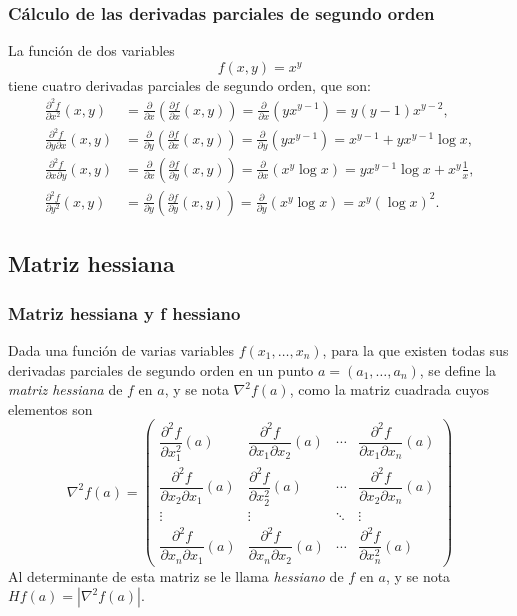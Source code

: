 \begin{frame}
\frametitle{Cálculo de las derivadas parciales de segundo orden}
La función de dos variables
\[f(x,y)=x^y\]
tiene cuatro derivadas parciales de segundo orden, que son:
\begin{align*}
\frac{\partial^2 f}{\partial x^2}(x,y) &=
\frac{\partial}{\partial x}\left(\frac{\partial f}{\partial x}(x,y)\right) =
\frac{\partial}{\partial x}\left(yx^{y-1}\right) =
y(y-1)x^{y-2},\\
\frac{\partial^2 f}{\partial y \partial x}(x,y) &=
\frac{\partial}{\partial y}\left(\frac{\partial f}{\partial x}(x,y)\right) =
\frac{\partial}{\partial y}\left(yx^{y-1}\right) =
x^{y-1}+yx^{y-1}\log x,\\
\frac{\partial^2 f}{\partial x \partial y}(x,y) &=
\frac{\partial}{\partial x}\left(\frac{\partial f}{\partial y}(x,y)\right) =
\frac{\partial}{\partial x}\left(x^y\log x \right) =
yx^{y-1}\log x+x^y\frac{1}{x},\\
\frac{\partial^2 f}{\partial y^2}(x,y) &=
\frac{\partial}{\partial y}\left(\frac{\partial f}{\partial y}(x,y)\right) =
\frac{\partial}{\partial y}\left(x^y\log x \right) =
x^y(\log x)^2.
\end{align*}
\end{frame}


\subsection{Matriz hessiana}
\begin{frame}
\frametitle{Matriz hessiana y f hessiano}
\begin{definicion}
Dada una función de varias variables $f(x_1,\ldots,x_n)$, para la que existen todas sus derivadas parciales de segundo
orden en un punto $a=(a_1,\ldots,a_n)$, se define la \emph{matriz hessiana} de $f$ en $a$, y se nota $\nabla^2f(a)$, como la
matriz cuadrada cuyos elementos son
\[
\nabla^2f(a)=\left(
\begin{array}{cccc}
\dfrac{\partial^2 f}{\partial x_1^2}(a) & 
\dfrac{\partial^2 f}{\partial x_1 \partial x_2}(a) &
\cdots &
\dfrac{\partial^2 f}{\partial x_1 \partial x_n}(a)\\
\dfrac{\partial^2 f}{\partial x_2 \partial x_1}(a) &
\dfrac{\partial^2 f}{\partial x_2^2}(a) & 
\cdots &
\dfrac{\partial^2 f}{\partial x_2 \partial x_n}(a)\\
\vdots & \vdots & \ddots & \vdots \\
\dfrac{\partial^2 f}{\partial x_n \partial x_1}(a) &
\dfrac{\partial^2 f}{\partial x_n \partial x_2}(a) &
\cdots &
\dfrac{\partial^2 f}{\partial x_n^2}(a)
\end{array}
\right)
\]
Al determinante de esta matriz se le llama \emph{hessiano} de $f$ en $a$, y se nota $Hf(a)=|\nabla^2f(a)|$.
\end{definicion}
\end{frame}



